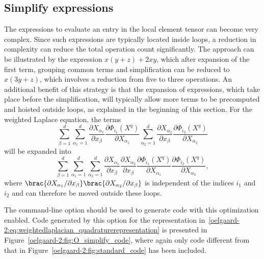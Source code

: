\vspace*{-3pt}\subsection{Simplify expressions}
\label{oelgaard-2:sec:simplify_expressions}

The expressions to evaluate an entry in the local element tensor can
become very complex. Since such expressions are typically located
inside loops, a reduction in complexity can reduce the total operation
count significantly.  The approach can be illustrated by the
expression $x (y + z) + 2 x y$, which after expansion of the first
term, grouping common terms and simplification can be reduced to $x (3
y + z)$, which involves a reduction from five to three operations.  An
additional benefit of this strategy is that the expansion of
expressions, which take place before the simplification, will
typically allow more terms to be precomputed and hoisted outside
loops, as explained in the beginning of this section.  For the
weighted Laplace equation, the terms
%
\begin{equation}
  \sum_{\beta=1}^d
  \sum_{\alpha_1=1}^d
    \frac{\partial X_{\alpha_1}}{\partial x_{\beta}}
    \frac{\partial \Phi_{i_1}(X^q)}{\partial X_{\alpha_1}}
  \sum_{\alpha_2=1}^d
    \frac{\partial X_{\alpha_2}}{\partial x_{\beta}}
    \frac{\partial \Phi_{i_2}(X^q)}{\partial X_{\alpha_2}}
\end{equation}
%
will be expanded into
%
\begin{equation}
  \sum_{\beta=1}^d
  \sum_{\alpha_1=1}^d
  \sum_{\alpha_2=1}^d
  \frac{\partial X_{\alpha_1}}{\partial x_{\beta}}
  \frac{\partial X_{\alpha_2}}{\partial x_{\beta}}
  \frac{\partial \Phi_{i_1}(X^q)}{\partial X_{\alpha_1}}
  \frac{\partial \Phi_{i_2}(X^q)}{\partial X_{\alpha_2}},
\end{equation}
%
where $\brac{\partial X_{\alpha_1} / \partial x_{\beta}}
\brac{\partial X_{\alpha_2} / \partial x_{\beta}}$ is independent of
the indices $i_1$ and $i_2$ and can therefore be moved outside these
loops.

The \ffc{} command-line option  should
be used to generate code with this optimization enabled.  Code
generated by this option for the representation
in~\eqref{oelgaard-2:eq:weightedlaplacian_quadraturerepresentation} is
presented in Figure~\ref{oelgaard-2:fig:O_simplify_code}, where again
only code different from that in
Figure~\ref{oelgaard-2:fig:standard_code} has been included.

